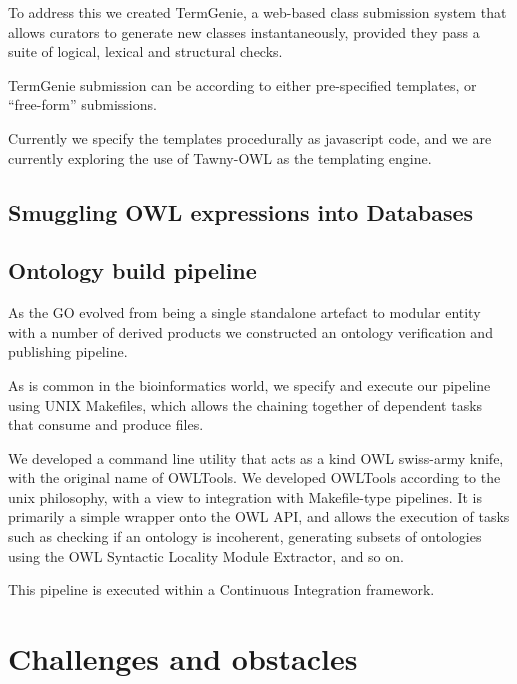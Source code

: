 \documentclass{llncs}
\begin{document}
To address this we created TermGenie\cite{Dietze2014}, a web-based
class submission system that allows curators to generate new classes
instantaneously, provided they pass a suite of logical, lexical and
structural checks.

TermGenie submission can be according to either pre-specified
templates, or ``free-form'' submissions.

Currently we specify the templates procedurally as javascript code,
and we are currently exploring the use of Tawny-OWL\cite{Tawny} as the
templating engine.



\subsection{Smuggling OWL expressions into Databases}

\cite{Huntley2014}


\subsection{Ontology build pipeline}

As the GO evolved from being a single standalone artefact to modular
entity with a number of derived products we constructed an ontology
verification and publishing pipeline.

As is common in the bioinformatics world, we specify and execute our
pipeline using UNIX Makefiles, which allows the chaining together of
dependent tasks that consume and produce files.

We developed a command line utility that acts as a kind OWL swiss-army
knife, with the original name of OWLTools\cite{OWLTools}. We developed
OWLTools according to the unix philosophy, with a view to integration
with Makefile-type pipelines. It is primarily a simple wrapper onto
the OWL API, and allows the execution of tasks such as checking if an
ontology is incoherent, generating subsets of ontologies using the OWL
Syntactic Locality Module Extractor, and so on.

This pipeline is executed within a Continuous Integration
framework\cite{Mungall2012a}.



\section{Challenges and obstacles}
\end{document}

